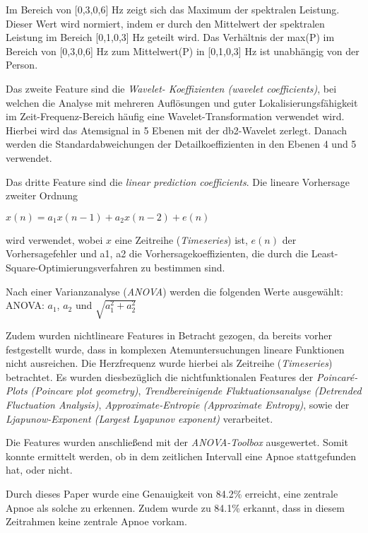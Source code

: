 Im Bereich von [0,3,0,6] Hz zeigt sich das Maximum der spektralen Leistung.
Dieser Wert wird normiert, indem er durch den Mittelwert der spektralen Leistung im Bereich [0,1,0,3] Hz geteilt wird. 
Das Verhältnis der max(P) im Bereich von [0,3,0,6] Hz zum Mittelwert(P) in [0,1,0,3] Hz ist unabhängig von der Person.

Das zweite Feature sind die \textit{Wavelet- Koeffizienten (wavelet coefficients)}, bei welchen die Analyse mit mehreren Auflösungen und guter Lokalisierungsfähigkeit im Zeit-Frequenz-Bereich häufig eine Wavelet-Transformation verwendet wird. 
Hierbei wird das Atemsignal in 5 Ebenen mit der db2-Wavelet zerlegt. Danach werden die Standardabweichungen der Detailkoeffizienten in den Ebenen 4 und 5 verwendet. 

Das dritte Feature sind die \textit{linear prediction coefficients}. 
Die lineare Vorhersage zweiter Ordnung
\begin{center}
    $x(n) = a_1 x(n-1) + a_2 x(n-2) + e(n)$
\end{center} 
wird verwendet, wobei $x$ eine Zeitreihe (\textit{Timeseries}) ist, $e(n)$ der Vorhersagefehler und {a1, a2} die Vorhersagekoeffizienten, die durch die Least-Square-Optimierungsverfahren zu bestimmen sind.

Nach einer Varianzanalyse (\textit{ANOVA}) werden die folgenden Werte ausgewählt: \\
ANOVA: $a_1$, $a_2$ und $\sqrt{a_1^{2} + a_2^{2}}$


Zudem wurden nichtlineare Features in Betracht gezogen, da bereits vorher festgestellt wurde, dass in komplexen Atemuntersuchungen lineare Funktionen nicht ausreichen. Die Herzfrequenz wurde hierbei als Zeitreihe (\textit{Timeseries}) betrachtet.
Es wurden diesbezüglich die nichtfunktionalen Features der \textit{Poincaré-Plots (Poincare plot geometry)}, \textit{Trendbereinigende Fluktuationsanalyse (Detrended Fluctuation Analysis)}, \textit{Approximate-Entropie (Approximate Entropy)}, sowie der \textit{Ljapunow-Exponent (Largest Lyapunov exponent)} verarbeitet. 

Die Features wurden anschließend mit der \textit{ANOVA-Toolbox} ausgewertet.
Somit konnte ermittelt werden, ob in dem zeitlichen Intervall eine Apnoe stattgefunden hat, oder nicht.

Durch dieses Paper wurde eine Genauigkeit von 84.2\% erreicht, eine zentrale Apnoe als solche zu erkennen.
Zudem wurde zu 84.1\% erkannt, dass in diesem Zeitrahmen keine zentrale Apnoe vorkam.


